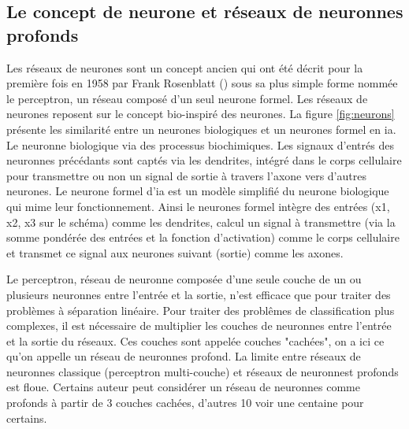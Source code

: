 \subsection{Le concept de neurone et réseaux de neuronnes profonds}
Les réseaux de neurones sont un concept ancien qui ont été décrit pour la première fois en 1958 par Frank Rosenblatt (\cite{rosenblatt_perceptron_1958}) sous sa plus simple forme nommée le perceptron, un réseau composé d'un seul neurone formel. Les réseaux de neurones reposent sur le concept bio-inspiré des neurones. La figure \ref{fig:neurons} présente les similarité entre un neurones biologiques et un neurones formel en \gls{ia}. Le neuronne biologique via des processus biochimiques. Les signaux d'entrés des neuronnes précédants sont captés via les dendrites, intégré dans le corps cellulaire pour transmettre ou non un signal de sortie à travers l'axone vers d'autres neurones. Le neurone formel d'\gls{ia} est un modèle simplifié du neurone biologique qui mime leur fonctionnement. Ainsi le neurones formel intègre des entrées (x1, x2, x3 sur le schéma) comme les dendrites, calcul un signal à transmettre (via la somme pondérée des entrées et la fonction d'activation) comme le corps cellulaire et transmet ce signal aux neurones suivant (sortie) comme les axones.

Le perceptron, réseau de neuronne composée d'une seule couche de un ou plusieurs neuronnes entre l'entrée et la sortie, n'est efficace que pour traiter des problèmes à séparation linéaire. Pour traiter des problêmes de classification plus complexes, il est nécessaire de multiplier les couches de neuronnes entre l'entrée et la sortie du réseaux. Ces couches sont appelée couches "cachées", on a ici ce qu'on appelle un réseau de neuronnes profond. La limite entre réseaux de neuronnes classique (perceptron multi-couche) et réseaux de neuronnest profonds est floue. Certains auteur peut considérer un réseau de neuronnes comme profonds à partir de 3 couches cachées, d'autres 10 voir une centaine pour certains.

